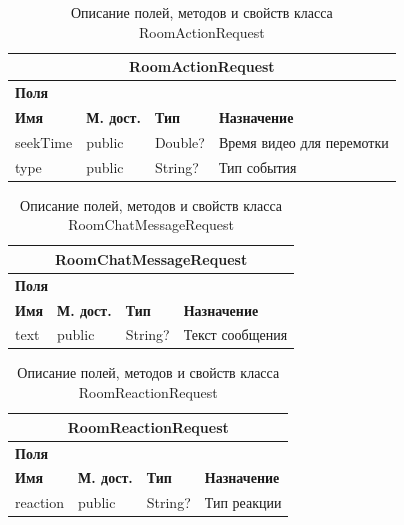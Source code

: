 \documentclass{../includes/TechDoc}
\begin{document}
    \begin{table}[h]
		\caption{\label{tab:class-WebsocketEventListener-table}Описание полей, методов и свойств класса RoomActionRequest}
	    \begin{tabularx}{\textwidth}{|l|l|l|X|}
	    	\hline
	  		\multicolumn{4}{|c|}{RoomActionRequest} \\ \hline
	  		\multicolumn{4}{|l|}{\textbf{Поля}} \\ \hline
	  		\textbf{Имя} & \textbf{М. дост.} & \textbf{Тип} & \textbf{Назначение} \\ \hline
			seekTime & public & Double? & Время видео для перемотки \\ \hline
			type & public & String? & Тип события \\ \hline
		\end{tabularx}
    \end{table}

    \begin{table}[h]
		\caption{\label{tab:class-WebsocketEventListener-table}Описание полей, методов и свойств класса RoomChatMessageRequest}
	    \begin{tabularx}{\textwidth}{|l|l|l|X|}
	    	\hline
	  		\multicolumn{4}{|c|}{RoomChatMessageRequest} \\ \hline
	  		\multicolumn{4}{|l|}{\textbf{Поля}} \\ \hline
	  		\textbf{Имя} & \textbf{М. дост.} & \textbf{Тип} & \textbf{Назначение} \\ \hline
			text & public & String? & Текст сообщения \\ \hline
		\end{tabularx}
    \end{table}

    \begin{table}[h]
		\caption{\label{tab:class-WebsocketEventListener-table}Описание полей, методов и свойств класса RoomReactionRequest}
	    \begin{tabularx}{\textwidth}{|l|l|l|X|}
	    	\hline
	  		\multicolumn{4}{|c|}{RoomReactionRequest} \\ \hline
	  		\multicolumn{4}{|l|}{\textbf{Поля}} \\ \hline
	  		\textbf{Имя} & \textbf{М. дост.} & \textbf{Тип} & \textbf{Назначение} \\ \hline
			reaction & public & String? & Тип реакции \\ \hline
		\end{tabularx}
    \end{table}
\end{document}
